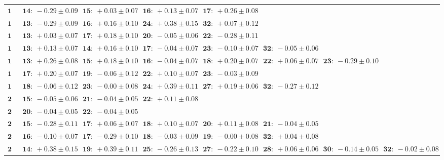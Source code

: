 \begin{landscape}
    \begin{table}[p]
        \footnotesize
        \begin{tabular}{r|lllllll}
            \hline
\( \mathbf{13} \)& \( \mathbf{14:}~-0.29 \pm 0.09 \)& \( \mathbf{15:}~+0.03 \pm 0.07 \)& \( \mathbf{16:}~+0.13 \pm 0.07 \)& \( \mathbf{17:}~+0.26 \pm 0.08 \)\\ 
\( \mathbf{14} \)& \( \mathbf{13:}~-0.29 \pm 0.09 \)& \( \mathbf{16:}~+0.16 \pm 0.10 \)& \( \mathbf{24:}~+0.38 \pm 0.15 \)& \( \mathbf{32:}~+0.07 \pm 0.12 \)\\ 
\( \mathbf{15} \)& \( \mathbf{13:}~+0.03 \pm 0.07 \)& \( \mathbf{17:}~+0.18 \pm 0.10 \)& \( \mathbf{20:}~-0.05 \pm 0.06 \)& \( \mathbf{22:}~-0.28 \pm 0.11 \)\\ 
\( \mathbf{16} \)& \( \mathbf{13:}~+0.13 \pm 0.07 \)& \( \mathbf{14:}~+0.16 \pm 0.10 \)& \( \mathbf{17:}~-0.04 \pm 0.07 \)& \( \mathbf{23:}~-0.10 \pm 0.07 \)& \( \mathbf{32:}~-0.05 \pm 0.06 \)\\ 
\( \mathbf{17} \)& \( \mathbf{13:}~+0.26 \pm 0.08 \)& \( \mathbf{15:}~+0.18 \pm 0.10 \)& \( \mathbf{16:}~-0.04 \pm 0.07 \)& \( \mathbf{18:}~+0.20 \pm 0.07 \)& \( \mathbf{22:}~+0.06 \pm 0.07 \)& \( \mathbf{23:}~-0.29 \pm 0.10 \)\\ 
\( \mathbf{18} \)& \( \mathbf{17:}~+0.20 \pm 0.07 \)& \( \mathbf{19:}~-0.06 \pm 0.12 \)& \( \mathbf{22:}~+0.10 \pm 0.07 \)& \( \mathbf{23:}~-0.03 \pm 0.09 \)\\ 
\( \mathbf{19} \)& \( \mathbf{18:}~-0.06 \pm 0.12 \)& \( \mathbf{23:}~-0.00 \pm 0.08 \)& \( \mathbf{24:}~+0.39 \pm 0.11 \)& \( \mathbf{27:}~+0.19 \pm 0.06 \)& \( \mathbf{32:}~-0.27 \pm 0.12 \)\\ 
\( \mathbf{20} \)& \( \mathbf{15:}~-0.05 \pm 0.06 \)& \( \mathbf{21:}~-0.04 \pm 0.05 \)& \( \mathbf{22:}~+0.11 \pm 0.08 \)\\ 
\( \mathbf{21} \)& \( \mathbf{20:}~-0.04 \pm 0.05 \)& \( \mathbf{22:}~-0.04 \pm 0.05 \)\\ 
\( \mathbf{22} \)& \( \mathbf{15:}~-0.28 \pm 0.11 \)& \( \mathbf{17:}~+0.06 \pm 0.07 \)& \( \mathbf{18:}~+0.10 \pm 0.07 \)& \( \mathbf{20:}~+0.11 \pm 0.08 \)& \( \mathbf{21:}~-0.04 \pm 0.05 \)\\ 
\( \mathbf{23} \)& \( \mathbf{16:}~-0.10 \pm 0.07 \)& \( \mathbf{17:}~-0.29 \pm 0.10 \)& \( \mathbf{18:}~-0.03 \pm 0.09 \)& \( \mathbf{19:}~-0.00 \pm 0.08 \)& \( \mathbf{32:}~+0.04 \pm 0.08 \)\\ 
\( \mathbf{24} \)& \( \mathbf{14:}~+0.38 \pm 0.15 \)& \( \mathbf{19:}~+0.39 \pm 0.11 \)& \( \mathbf{25:}~-0.26 \pm 0.13 \)& \( \mathbf{27:}~-0.22 \pm 0.10 \)& \( \mathbf{28:}~+0.06 \pm 0.06 \)& \( \mathbf{30:}~-0.14 \pm 0.05 \)& \( \mathbf{32:}~-0.02 \pm 0.08 \)\\ 

\end{tabular}
\end{table}
\end{landscape}
